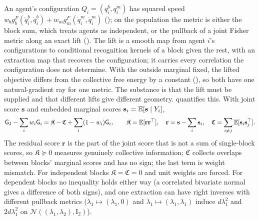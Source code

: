 An agent's configuration $Q_i=(q_i^b,q_i^m)$ has squared speed $w_bg^F_b(\dot q_i^b,\dot q_i^b)+
w_mg^F_m(\dot q_i^m,\dot q_i^m)$ (); on the population the metric
is either the block sum, which treats agents as independent, or the pullback of a joint Fisher metric
along an exact lift (). The lift is a smooth map from agent $i$'s
configurations to conditional recognition kernels of a block given the rest, with an extraction map
that recovers the configuration; it carries every correlation the configuration does not determine.
With the outside marginal fixed, the lifted objective differs from the collective free energy by a
constant (), so both have one natural-gradient ray for one metric.
The substance is that the lift must be supplied and that different lifts give different geometry.
 quantifies this. With joint score $\mathbf s$ and embedded
marginal scores $\mathbf s_i=\mathbb E[\mathbf s\mid Y_i]$,
\[
\mathsf G_{\mathrm J}-\sum_iw_i\mathsf G_i=\mathfrak K-\mathfrak C+\sum_i(1-w_i)\mathsf G_i,
\qquad
\mathfrak K=\mathbb E[\mathbf r\mathbf r^\top],
\quad
\mathbf r=\mathbf s-\sum_i\mathbf s_i,
\quad
\mathfrak C=\sum_{i\neq j}\mathbb E[\mathbf s_i\mathbf s_j^\top].
\]
The residual score $\mathbf r$ is the part of the joint score that is not a sum of single-block
scores, so $\mathfrak K\succeq0$ measures genuinely collective information; $\mathfrak C$ collects
overlaps between blocks' marginal scores and has no sign; the last term is weight mismatch. For
independent blocks $\mathfrak K=\mathfrak C=0$ and unit weights are forced. For dependent blocks no
inequality holds either way (a correlated bivariate normal gives a difference of both signs), and one
extraction can have right inverses with different pullback metrics ($\lambda_1\mapsto(\lambda_1,0)$
and $\lambda_1\mapsto(\lambda_1,\lambda_1)$ induce $d\lambda_1^2$ and $2d\lambda_1^2$ on
$\mathcal N((\lambda_1,\lambda_2),\mathrm I_2)$).

